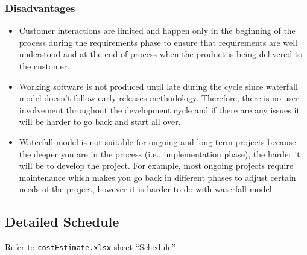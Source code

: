 \documentclass{article}
\begin{document}
\subsubsection{Disadvantages}
\begin{itemize}
\item Customer interactions are limited and happen only in the beginning of the process during the requirements phase to ensure that requirements are well understood and at the end of process when the product is being delivered to the customer.
\item Working software is not produced until late during the cycle since waterfall model doesn’t follow early releases methodology. Therefore, there is no user involvement throughout the development cycle and if there are any issues it will be harder to go back and start all over.
\item Waterfall model is not suitable for ongoing and long-term projects because the deeper you are in the process (i.e., implementation phase), the harder it will be to develop the project. For example, most ongoing projects require maintenance which makes you go back in different phases to adjust certain needs of the project, however it is harder to do with waterfall model. 
\end{itemize}

\subsection{Detailed Schedule}
Refer to \texttt{costEstimate.xlsx} sheet ``Schedule''
\end{document}
